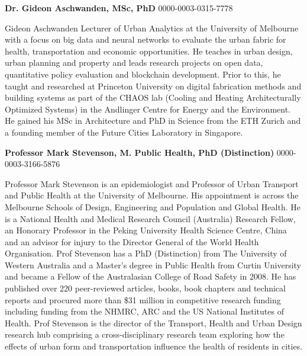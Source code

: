 \documentclass[Crown,sageh,times]{sagej}
\begin{document}
\begin{biogs}
\textbf{Dr. Gideon Aschwanden, MSc, PhD}
0000-0003-0315-7778

Gideon Aschwanden Lecturer of Urban Analytics at the University of Melbourne with a focus on big data and neural networks to evaluate the urban fabric for health, transportation and economic opportunities. He teaches in urban design, urban planning and property and leads research projects on open data, quantitative policy evaluation and blockchain development. Prior to this, he taught and researched at Princeton University on digital fabrication methods and building systems as part of the CHAOS lab (Cooling and Heating Architecturally Optimized Systems) in the Andlinger Centre for Energy and the Environment. He gained his MSc in Architecture and PhD in Science from the ETH Zurich and a founding member of the Future Cities Laboratory in Singapore.   

\textbf{Professor Mark Stevenson, M. Public Health, PhD (Distinction)}
0000-0003-3166-5876

Professor Mark Stevenson is an epidemiologist and Professor of Urban Transport and Public Health at the University of Melbourne. His appointment is across the Melbourne Schools of Design, Engineering and Population and Global Health. He is a National Health and Medical Research Council (Australia) Research Fellow, an Honorary Professor in the Peking University Health Science Centre, China and an advisor for injury to the Director General of the World Health Organisation. Prof Stevenson has a PhD (Distinction) from The University of Western Australia and a Master’s degree in Public Health from Curtin University and became a Fellow of the Australasian College of Road Safety in 2008. He has published over 220 peer-reviewed articles, books, book chapters and technical reports and procured more than \$31 million in competitive research funding including funding from the NHMRC, ARC and the US National Institutes of Health. Prof Stevenson is the director of the Transport, Health and Urban Design research hub comprising a cross-disciplinary research team exploring how the effects of urban form and transportation influence the health of residents in cities.

\end{biogs}
\end{document}
